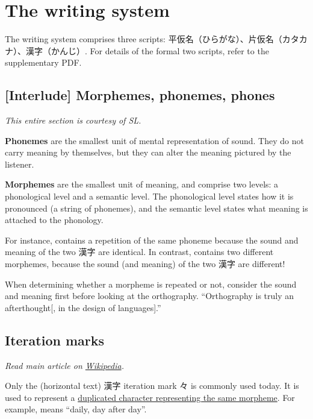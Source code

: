 \documentclass[../nihongo-gakushuu-kyouzai.tex]{subfiles}
\begin{document}
\setcounter{section}{0}
\section{The writing system}
The writing system comprises three scripts: 平仮名（ひらがな）、片仮名（カタカナ）、漢字（かんじ）. For details of the formal two scripts, refer to the supplementary PDF.

\subsection{[Interlude] Morphemes, phonemes, phones}
\emph{This entire section is courtesy of SL.}

\textbf{Phonemes} are the smallest unit of mental representation of sound. They do not carry meaning by themselves, but they can alter the meaning pictured by the listener.

\textbf{Morphemes} are the smallest unit of meaning, and comprise two levels: a phonological level and a semantic level. The phonological level states how it is pronounced (a string of phonemes), and the semantic level states what meaning is attached to the phonology.

For instance,  contains a repetition of the same phoneme because the sound and meaning of the two 漢字 are identical. In contrast,  contains two different morphemes, because the sound (and meaning) of the two 漢字 are different!

When determining whether a morpheme is repeated or not, consider the sound and meaning first before looking at the orthography. ``Orthography is truly an afterthought[, in the design of languages].''


\subsection{Iteration marks}
\emph{Read main article on \href{https://en.wikipedia.org/wiki/Iteration_mark\#Japanese}{Wikipedia}.}

Only the (horizontal text) 漢字 iteration mark 々 is commonly used today. It is used to represent a \ul{duplicated character representing the same morpheme}. For example,  means ``daily, day after day''.
\end{document}
